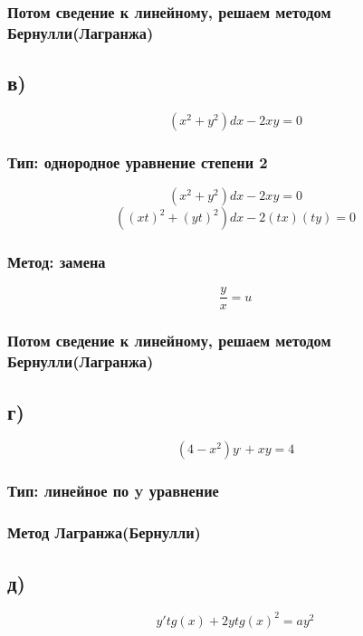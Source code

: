 \documentclass[a4paper]{article}
\begin{document}
\subsubsection*{Потом сведение к линейному, решаем методом Бернулли(Лагранжа)}
\subsection*{в)}
\begin{equation*}
(x^2+ y^2)dx - 2xy = 0
\end{equation*}
\subsubsection*{Тип: однородное уравнение степени 2}

\begin{equation*}
(x^2+ y^2)dx - 2xy = 0
\end{equation*}
\begin{equation*}
((xt)^2+ (yt)^2)dx - 2(tx)(ty) = 0
\end{equation*}
\subsubsection*{Метод: замена  }
\begin{equation*}
\frac{y}{x} = u
\end{equation*}
\subsubsection*{Потом сведение к линейному, решаем методом Бернулли(Лагранжа)}

\subsection*{г)}
\begin{equation*}
(4 - x^2)y^, + xy = 4
\end{equation*}
\subsubsection*{Тип: линейное по y уравнение}

\subsubsection*{Метод Лагранжа(Бернулли)}

\subsection*{д)}
\begin{equation*}
y' tg(x) + 2y tg(x)^2 = a y^2
\end{equation*}
\end{document}

